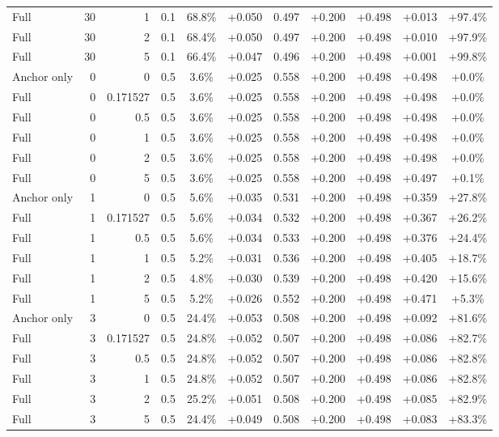 \begin{table}[htbp]
\begin{tabular}{lrrrccccccc}
Full & 30 & 1 & 0.1 & 68.8\% & +0.050 & 0.497 & +0.200 & +0.498 & +0.013 & +97.4\% \\
Full & 30 & 2 & 0.1 & 68.4\% & +0.050 & 0.497 & +0.200 & +0.498 & +0.010 & +97.9\% \\
Full & 30 & 5 & 0.1 & 66.4\% & +0.047 & 0.496 & +0.200 & +0.498 & +0.001 & +99.8\% \\
Anchor only & 0 & 0 & 0.5 & 3.6\% & +0.025 & 0.558 & +0.200 & +0.498 & +0.498 & +0.0\% \\
Full & 0 & 0.171527 & 0.5 & 3.6\% & +0.025 & 0.558 & +0.200 & +0.498 & +0.498 & +0.0\% \\
Full & 0 & 0.5 & 0.5 & 3.6\% & +0.025 & 0.558 & +0.200 & +0.498 & +0.498 & +0.0\% \\
Full & 0 & 1 & 0.5 & 3.6\% & +0.025 & 0.558 & +0.200 & +0.498 & +0.498 & +0.0\% \\
Full & 0 & 2 & 0.5 & 3.6\% & +0.025 & 0.558 & +0.200 & +0.498 & +0.498 & +0.0\% \\
Full & 0 & 5 & 0.5 & 3.6\% & +0.025 & 0.558 & +0.200 & +0.498 & +0.497 & +0.1\% \\
Anchor only & 1 & 0 & 0.5 & 5.6\% & +0.035 & 0.531 & +0.200 & +0.498 & +0.359 & +27.8\% \\
Full & 1 & 0.171527 & 0.5 & 5.6\% & +0.034 & 0.532 & +0.200 & +0.498 & +0.367 & +26.2\% \\
Full & 1 & 0.5 & 0.5 & 5.6\% & +0.034 & 0.533 & +0.200 & +0.498 & +0.376 & +24.4\% \\
Full & 1 & 1 & 0.5 & 5.2\% & +0.031 & 0.536 & +0.200 & +0.498 & +0.405 & +18.7\% \\
Full & 1 & 2 & 0.5 & 4.8\% & +0.030 & 0.539 & +0.200 & +0.498 & +0.420 & +15.6\% \\
Full & 1 & 5 & 0.5 & 5.2\% & +0.026 & 0.552 & +0.200 & +0.498 & +0.471 & +5.3\% \\
Anchor only & 3 & 0 & 0.5 & 24.4\% & +0.053 & 0.508 & +0.200 & +0.498 & +0.092 & +81.6\% \\
Full & 3 & 0.171527 & 0.5 & 24.8\% & +0.052 & 0.507 & +0.200 & +0.498 & +0.086 & +82.7\% \\
Full & 3 & 0.5 & 0.5 & 24.8\% & +0.052 & 0.507 & +0.200 & +0.498 & +0.086 & +82.8\% \\
Full & 3 & 1 & 0.5 & 24.8\% & +0.052 & 0.507 & +0.200 & +0.498 & +0.086 & +82.8\% \\
Full & 3 & 2 & 0.5 & 25.2\% & +0.051 & 0.508 & +0.200 & +0.498 & +0.085 & +82.9\% \\
Full & 3 & 5 & 0.5 & 24.4\% & +0.049 & 0.508 & +0.200 & +0.498 & +0.083 & +83.3\% \\

\end{tabular}
\end{table}

